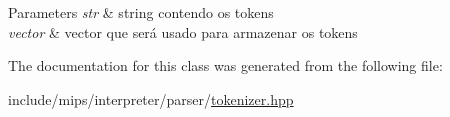 \begin{DoxyParams}{Parameters}
{\em str} & string contendo os tokens \\
\hline
{\em vector} & vector que será usado para armazenar os tokens \\
\hline
\end{DoxyParams}


The documentation for this class was generated from the following file\+:\begin{DoxyCompactItemize}
\item 
include/mips/interpreter/parser/\hyperlink{tokenizer_8hpp}{tokenizer.\+hpp}\end{DoxyCompactItemize}
